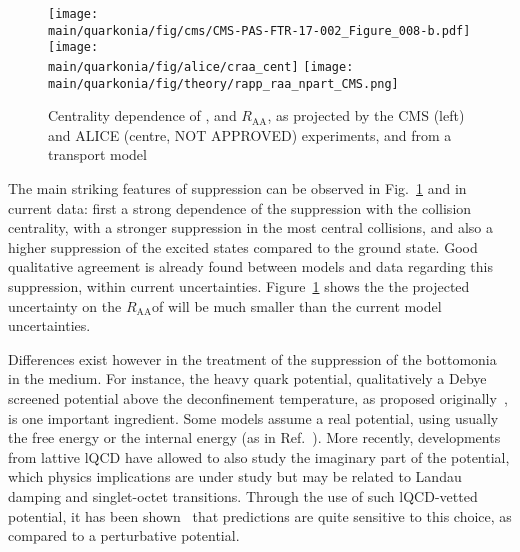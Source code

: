 \documentclass[../report.tex]{subfiles}
\providecommand{\main}{..}
\providecommand{\raa}{\ensuremath{R_\text{AA}}\Xspace}
\begin{document}

\begin{figure}
\begin{center}
 \texttt{[image: \\main/quarkonia/fig/cms/CMS-PAS-FTR-17-002\_Figure\_008-b.pdf]}
 \texttt{[image: \\main/quarkonia/fig/alice/craa\_cent]}
 \texttt{[image: \\main/quarkonia/fig/theory/rapp\_raa\_npart\_CMS.png]}
\end{center}

 \caption{Centrality dependence of ,  and  \raa, as projected by the CMS\cite{CMS-PAS-FTR-17-002,Krouppa:2016jcl} (left) and ALICE (centre,
 NOT APPROVED) experiments, and from a transport model\cite{Du:2017qkv}}
 \label{fig:upsi_raa_npart}
\end{figure}

% 


The main striking features of \PGU suppression can be observed in Fig.~\ref{fig:upsi_raa_npart} and in current data: first a strong dependence of the suppression with the collision
centrality, with a stronger suppression in the most central collisions, and also a higher suppression of the excited states compared to the ground state. Good qualitative agreement
is already found between models and data regarding this suppression, within current uncertainties. Figure~\ref{fig:upsi_raa_npart} shows the the projected uncertainty on the \raa of  will be much smaller than the current model uncertainties.

Differences exist however in the treatment of the suppression of the bottomonia in the medium.
For instance, the heavy quark potential, qualitatively a Debye screened potential above the deconfinement temperature, as proposed originally~\cite{Matsui:1986dk}, is one important
ingredient. Some models assume a real potential, using usually the free energy or the internal energy (as in Ref.~\cite{Du:2017qkv}). More recently, developments from lattive lQCD
have allowed to also study the imaginary part of the potential, which physics implications are under study but may be related to Landau damping and singlet-octet transitions. Through the 
use of such lQCD-vetted potential, it has been shown~\cite{Krouppa:2017jlg} that predictions are quite sensitive to this choice, as compared to a perturbative potential. 
\end{document}
